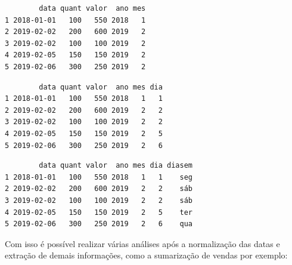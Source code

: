 \documentclass[12pt,brazil,oneside]{book}
\newenvironment{Shaded}{\begin{snugshade}}{\end{snugshade}}
\newcommand{\CommentTok}[1]{\textcolor[rgb]{0.56,0.35,0.01}{\textit{#1}}}
\newcommand{\DataTypeTok}[1]{\textcolor[rgb]{0.13,0.29,0.53}{#1}}
\newcommand{\KeywordTok}[1]{\textcolor[rgb]{0.13,0.29,0.53}{\textbf{#1}}}
\newcommand{\NormalTok}[1]{#1}
\newcommand{\OperatorTok}[1]{\textcolor[rgb]{0.81,0.36,0.00}{\textbf{#1}}}
\newcommand{\OtherTok}[1]{\textcolor[rgb]{0.56,0.35,0.01}{#1}}
\begin{document}
\begin{Shaded}
\end{Shaded}

\begin{verbatim}
        data quant valor  ano mes
1 2018-01-01   100   550 2018   1
2 2019-02-02   200   600 2019   2
3 2019-02-02   100   100 2019   2
4 2019-02-05   150   150 2019   2
5 2019-02-06   300   250 2019   2
\end{verbatim}

\begin{Shaded}
\end{Shaded}

\begin{verbatim}
        data quant valor  ano mes dia
1 2018-01-01   100   550 2018   1   1
2 2019-02-02   200   600 2019   2   2
3 2019-02-02   100   100 2019   2   2
4 2019-02-05   150   150 2019   2   5
5 2019-02-06   300   250 2019   2   6
\end{verbatim}

\begin{Shaded}
\end{Shaded}

\begin{verbatim}
        data quant valor  ano mes dia diasem
1 2018-01-01   100   550 2018   1   1    seg
2 2019-02-02   200   600 2019   2   2    sáb
3 2019-02-02   100   100 2019   2   2    sáb
4 2019-02-05   150   150 2019   2   5    ter
5 2019-02-06   300   250 2019   2   6    qua
\end{verbatim}

Com isso é possível realizar várias análises após a normalização das datas e extração de demais informações, como a sumarização de vendas por exemplo:
\end{document}
